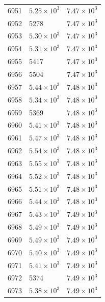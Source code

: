 \begin{table}[H]
\begin{tabular}{lll}
6951 & $\displaystyle 5.25 \times 10^{3}$ & $\displaystyle 7.47 \times 10^{3}$ \\
6952 & 5278 & $\displaystyle 7.47 \times 10^{3}$ \\
6953 & $\displaystyle 5.30 \times 10^{3}$ & $\displaystyle 7.47 \times 10^{3}$ \\
6954 & $\displaystyle 5.31 \times 10^{3}$ & $\displaystyle 7.47 \times 10^{3}$ \\
6955 & 5417 & $\displaystyle 7.47 \times 10^{3}$ \\
6956 & 5504 & $\displaystyle 7.47 \times 10^{3}$ \\
6957 & $\displaystyle 5.44 \times 10^{3}$ & $\displaystyle 7.48 \times 10^{3}$ \\
6958 & $\displaystyle 5.34 \times 10^{3}$ & $\displaystyle 7.48 \times 10^{3}$ \\
6959 & 5369 & $\displaystyle 7.48 \times 10^{3}$ \\
6960 & $\displaystyle 5.41 \times 10^{3}$ & $\displaystyle 7.48 \times 10^{3}$ \\
6961 & $\displaystyle 5.47 \times 10^{3}$ & $\displaystyle 7.48 \times 10^{3}$ \\
6962 & $\displaystyle 5.54 \times 10^{3}$ & $\displaystyle 7.48 \times 10^{3}$ \\
6963 & $\displaystyle 5.55 \times 10^{3}$ & $\displaystyle 7.48 \times 10^{3}$ \\
6964 & $\displaystyle 5.52 \times 10^{3}$ & $\displaystyle 7.48 \times 10^{3}$ \\
6965 & $\displaystyle 5.51 \times 10^{3}$ & $\displaystyle 7.48 \times 10^{3}$ \\
6966 & $\displaystyle 5.44 \times 10^{3}$ & $\displaystyle 7.48 \times 10^{3}$ \\
6967 & $\displaystyle 5.43 \times 10^{3}$ & $\displaystyle 7.49 \times 10^{3}$ \\
6968 & $\displaystyle 5.49 \times 10^{3}$ & $\displaystyle 7.49 \times 10^{3}$ \\
6969 & $\displaystyle 5.49 \times 10^{3}$ & $\displaystyle 7.49 \times 10^{3}$ \\
6970 & $\displaystyle 5.40 \times 10^{3}$ & $\displaystyle 7.49 \times 10^{3}$ \\
6971 & $\displaystyle 5.41 \times 10^{3}$ & $\displaystyle 7.49 \times 10^{3}$ \\
6972 & 5374 & $\displaystyle 7.49 \times 10^{3}$ \\
6973 & $\displaystyle 5.38 \times 10^{3}$ & $\displaystyle 7.49 \times 10^{3}$ \\

\end{tabular}
\end{table}
